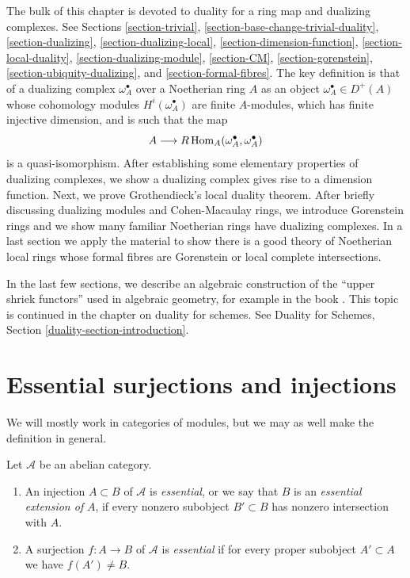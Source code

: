 \medskip\noindent
The bulk of this chapter is devoted to duality for a ring map and
dualizing complexes. See
Sections \ref{section-trivial},
\ref{section-base-change-trivial-duality},
\ref{section-dualizing},
\ref{section-dualizing-local},
\ref{section-dimension-function},
\ref{section-local-duality},
\ref{section-dualizing-module},
\ref{section-CM},
\ref{section-gorenstein},
\ref{section-ubiquity-dualizing}, and
\ref{section-formal-fibres}.
The key definition is that of a dualizing complex
$\omega_A^\bullet$ over a Noetherian ring $A$ as an object
$\omega_A^\bullet \in D^{+}(A)$ whose cohomology modules
$H^i(\omega_A^\bullet)$ are finite $A$-modules, which has
finite injective dimension, and is such that the map
$$
A \longrightarrow R\mathop{\mathrm{Hom}}\nolimits_A(\omega_A^\bullet, \omega_A^\bullet)
$$
is a quasi-isomorphism. After establishing some elementary properties
of dualizing complexes, we show a dualizing complex gives rise to a
dimension function. Next, we prove Grothendieck's local duality theorem.
After briefly discussing dualizing modules and Cohen-Macaulay rings,
we introduce Gorenstein rings and we show many familiar Noetherian
rings have dualizing complexes. In a last section we apply the material
to show there is a good theory of Noetherian local rings whose formal fibres
are Gorenstein or local complete intersections.

\medskip\noindent
In the last few sections, we describe an algebraic construction of
the ``upper shriek functors'' used in algebraic geometry, for example
in the book \cite{RD}. This topic is continued in the chapter on
duality for schemes. See
Duality for Schemes, Section \ref{duality-section-introduction}.







\section{Essential surjections and injections}
\label{section-essential}

\noindent
We will mostly work in categories of modules, but we may as well make
the definition in general.

\begin{definition}
\label{definition-essential}
Let $\mathcal{A}$ be an abelian category.
\begin{enumerate}
\item An injection $A \subset B$ of $\mathcal{A}$ is {\it essential},
or we say that $B$ is an {\it essential extension of} $A$,
if every nonzero subobject $B' \subset B$ has nonzero intersection with $A$.
\item A surjection $f : A \to B$ of $\mathcal{A}$ is {\it essential}
if for every proper subobject $A' \subset A$ we have $f(A') \not = B$.
\end{enumerate}
\end{definition}

